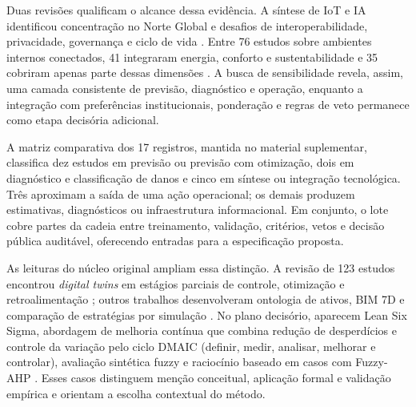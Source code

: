 Duas revisões qualificam o alcance dessa evidência. A síntese de IoT e IA identificou concentração no Norte Global e desafios de interoperabilidade, privacidade, governança e ciclo de vida \parencite{das_iotai_2025}. Entre 76 estudos sobre ambientes internos conectados, 41 integraram energia, conforto e sustentabilidade e 35 cobriram apenas parte dessas dimensões \parencite{alici_iotambientes_2026}. A busca de sensibilidade revela, assim, uma camada consistente de previsão, diagnóstico e operação, enquanto a integração com preferências institucionais, ponderação e regras de veto permanece como etapa decisória adicional.

A matriz comparativa dos 17 registros, mantida no material suplementar, classifica dez estudos em previsão ou previsão com otimização, dois em diagnóstico e classificação de danos e cinco em síntese ou integração tecnológica. Três aproximam a saída de uma ação operacional; os demais produzem estimativas, diagnósticos ou infraestrutura informacional. Em conjunto, o lote cobre partes da cadeia entre treinamento, validação, critérios, vetos e decisão pública auditável, oferecendo entradas para a especificação proposta.

As leituras do núcleo original ampliam essa distinção. A revisão de 123 estudos encontrou \textit{digital twins} em estágios parciais de controle, otimização e retroalimentação \parencite{deng_bimdigitaltwins_2021}; outros trabalhos desenvolveram ontologia de ativos, BIM 7D e comparação de estratégias por simulação \parencite{gispert_ontologiaativos_2025,goretti_bimoem_2023,ferreira_manutencaoceramica_2020}. No plano decisório, aparecem Lean Six Sigma, abordagem de melhoria contínua que combina redução de desperdícios e controle da variação pelo ciclo DMAIC (definir, medir, analisar, melhorar e controlar), avaliação sintética fuzzy e raciocínio baseado em casos com Fuzzy-AHP \parencite{aldairi_lean6sbm_2017,yoon_fuzzyfm_2018,park_cbrfuzzyahp_2019}. Esses casos distinguem menção conceitual, aplicação formal e validação empírica e orientam a escolha contextual do método.

